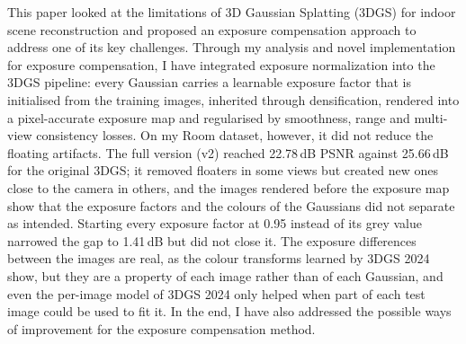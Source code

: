 \documentclass[11pt,a4paper]{article}
\begin{document}
This paper looked at the limitations of 3D Gaussian Splatting (3DGS) for indoor scene reconstruction and proposed an exposure compensation approach to address one of its key challenges. Through my analysis and novel implementation for exposure compensation, I have integrated exposure normalization into the 3DGS pipeline: every Gaussian carries a learnable exposure factor that is initialised from the training images, inherited through densification, rendered into a pixel-accurate exposure map and regularised by smoothness, range and multi-view consistency losses. On my Room dataset, however, it did not reduce the floating artifacts. The full version (v2) reached 22.78\,dB PSNR against 25.66\,dB for the original 3DGS; it removed floaters in some views but created new ones close to the camera in others, and the images rendered before the exposure map show that the exposure factors and the colours of the Gaussians did not separate as intended. Starting every exposure factor at 0.95 instead of its grey value narrowed the gap to 1.41\,dB but did not close it. The exposure differences between the images are real, as the colour transforms learned by 3DGS 2024 show, but they are a property of each image rather than of each Gaussian, and even the per-image model of 3DGS 2024 only helped when part of each test image could be used to fit it. In the end, I have also addressed the possible ways of improvement for the exposure compensation method.
\end{document}
